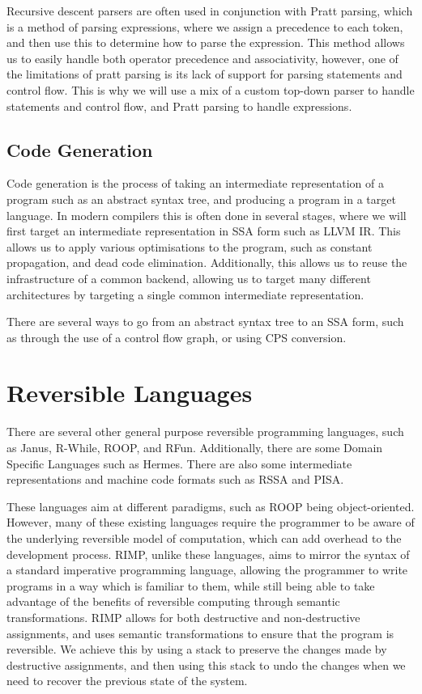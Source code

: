 Recursive descent parsers are often used in conjunction with Pratt parsing\cite{PrattParsing}, which is a method of parsing expressions, where we assign a precedence to each token, and then use this to determine how to parse the expression.
This method allows us to easily handle both operator precedence and associativity, however, one of the limitations of pratt parsing is its lack of support for parsing statements and control flow.
This is why we will use a mix of a custom top-down parser to handle statements and control flow, and Pratt parsing to handle expressions.

\subsection*{Code Generation}
Code generation is the process of taking an intermediate representation of a program such as an abstract syntax tree, and producing a program in a target language.
In modern compilers this is often done in several stages, where we will first target an intermediate representation in SSA form such as LLVM IR.
This allows us to apply various optimisations to the program, such as constant propagation, and dead code elimination\cite{OptimiseReversiblePrograms, combiningOptimisation, constantProp}.
Additionally, this allows us to reuse the infrastructure of a common backend, allowing us to target many different architectures by targeting a single common intermediate representation.

There are several ways to go from an abstract syntax tree to an SSA form, such as through the use of a control flow graph, or using CPS conversion\cite{SSAConstruction, SSAConstructionBraun}.

\section*{Reversible Languages}
There are several other general purpose reversible programming languages, such as Janus\cite{JanusFormalised, JanusLetter}, R-While\cite{ReversibleMetalanguages}, ROOP\cite{ROOPImplementation, ROOP}, and RFun\cite{RFun, RFunInterpreter}.
Additionally, there are some Domain Specific Languages such as Hermes\cite{Hermes}.
There are also some intermediate representations and machine code formats such as RSSA\cite{RSSA} and PISA\cite{PISA}.

These languages aim at different paradigms, such as ROOP being object-oriented.
However, many of these existing languages require the programmer to be aware of the underlying reversible model of computation, which can add overhead to the development process.
RIMP\cite{RIMP}, unlike these languages, aims to mirror the syntax of a standard imperative programming language, allowing the programmer to write programs in a way which is familiar to them, while still being able to take advantage of the benefits of reversible computing through semantic transformations.
RIMP allows for both destructive and non-destructive assignments, and uses semantic transformations to ensure that the program is reversible.
We achieve this by using a stack to preserve the changes made by destructive assignments, and then using this stack to undo the changes when we need to recover the previous state of the system.

